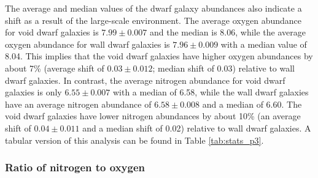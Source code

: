 The average and median values of the dwarf galaxy abundances also indicate a 
shift as a result of the large-scale environment.  The average oxygen abundance 
for void dwarf galaxies is $7.99\pm 0.007$ and the median is 8.06, while the 
average oxygen abundance for wall dwarf galaxies is $7.96\pm 0.009$ with a 
median value of 8.04.  This implies that the void dwarf galaxies have higher 
oxygen abundances by about 7\% (average shift of $0.03\pm 0.012$; median shift 
of 0.03) relative to wall dwarf galaxies.  In contrast, the average nitrogen 
abundance for void dwarf galaxies is only $6.55\pm 0.007$ with a median of 6.58, 
while the wall dwarf galaxies have an average nitrogen abundance of 
$6.58\pm 0.008$ and a median of 6.60.  The void dwarf galaxies have lower 
nitrogen abundances by about 10\% (an average shift of $0.04\pm 0.011$ and a 
median shift of 0.02) relative to wall dwarf galaxies.  A tabular version of 
this analysis can be found in Table \ref{tab:stats_p3}.


\subsubsection{Ratio of nitrogen to oxygen}

